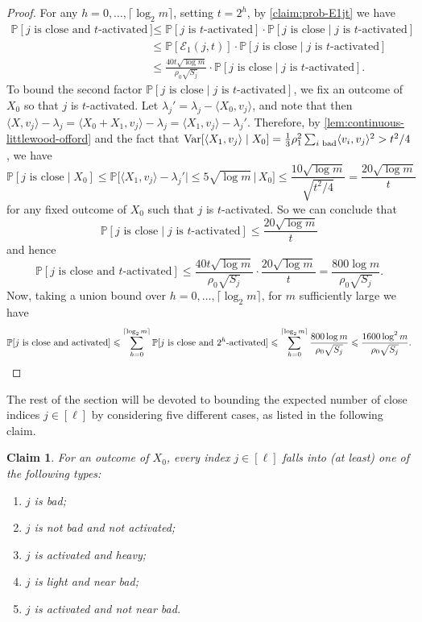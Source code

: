 \documentclass[reqno]{amsart}
\newtheorem{claim}[theorem]{Claim}
\theoremstyle{remark}
\theoremstyle{definition}
\numberwithin{theorem}{section}
\renewcommand{\(}{\bigl(}
\renewcommand{\)}{\bigr)\vphantom{)}}
\newcommand{\cE}{\mathcal E}
\renewcommand{\le}{\leqslant}
\renewcommand{\P}{\mathbb{P}}
\newcommand{\ceil}[1]{\lceil#1\rceil}
\newcommand{\ang}[1]{\langle#1\rangle}
\newcommand{\var}{\textup{Var}}
\begin{document}
\begin{proof}
    For any $h = 0,\dots, \ceil{\log_2 m}$, setting $t=2^h$, by \cref{claim:prob-E1jt} we have
    \begin{align*}
        \P[j\text{ is close and $t$-activated}] &\le \P[j \text{ is $t$-activated}]\cdot \P[j\text{ is close}\mid j \text{ is $t$-activated}]\\
        &\le \P[\cE_1(j,t)]\cdot \P[j\text{ is close}\mid j \text{ is $t$-activated}]\\
        &\le \frac{40t\sqrt{\log m}}{\rho_0\sqrt{S_j}}\cdot \P[j\text{ is close}\mid j \text{ is $t$-activated}].
    \end{align*}
    To bound the second factor $\P[j\text{ is close}\mid j \text{ is $t$-activated}]$, we fix an outcome of $X_0$ so that $j$ is $t$-activated. Let $\lambda_j' = \lambda_j - \ang{X_0, v_j}$, and note that then $\ang{X,v_j} - \lambda_j=\ang{X_0+X_1,v_j} - \lambda_j=\ang{X_1,v_j} - \lambda_j'$. Therefore, by \cref{lem:continuous-littlewood-offord} and the fact that $\var[\ang{X_1,v_j}\mid X_0]=\frac{1}{3}\rho_1^2\sum_{i \text{ bad}}\ang{v_i, v_j}^2 > t^2/4$, we have
    \[\P[j\text{ is close}\mid X_0]\le \P\Big[\ang{X_1,v_j} - \lambda_j'|\le 5\sqrt{\log m} \,\Big|\, X_0\Big]\le \frac{10\sqrt{\log m}}{\sqrt{t^2/4}}=\frac{20\sqrt{\log m}}{t}\]
    for any fixed outcome of $X_0$ such that $j$ is $t$-activated. So we can conclude that
    \[\P[j\text{ is close}\mid j \text{ is $t$-activated}]\le \frac{20\sqrt{\log m}}{t}\]
    and hence
    \[\P[j\text{ is close and $t$-activated}] \le \frac{40t\sqrt{\log m}}{\rho_0\sqrt{S_j}}\cdot\frac{20\sqrt{\log m}}{t} =  \frac{800\log m}{\rho_0\sqrt{S_j}}.\]
    Now, taking a union bound over $h = 0,\dots, \ceil{\log_2 m}$, for $m$ sufficiently large we have 
    \[
        \P[j\text{ is close and activated}]\le \sum_{h = 0}^{\ceil{\log_2 m}} \P[j\text{ is close and $2^h$-activated}]\le \sum_{h = 0}^{\ceil{\log_2 m}} \frac{800\log m}{\rho_0\sqrt{S_j}}
        \le \frac{1600\log^2 m}{\rho_0\sqrt{S_j}}.\qedhere
    \]
\end{proof}

The rest of the section will be devoted to bounding the expected number of close indices $j\in [\ell]$ by considering five different cases, as listed in the following claim.

\begin{claim}\label{claim:close-categories}
    For an outcome of $X_0$, every index $j\in [\ell]$ falls into (at least) one of the following types:
    \begin{enumerate}
    \item $j$ is bad;
    \item $j$ is not bad and not activated;
    \item $j$ is activated and heavy;
    \item $j$ is light and near bad;
    \item $j$ is activated and not near bad.
\end{enumerate}
\end{claim}
\end{document}
